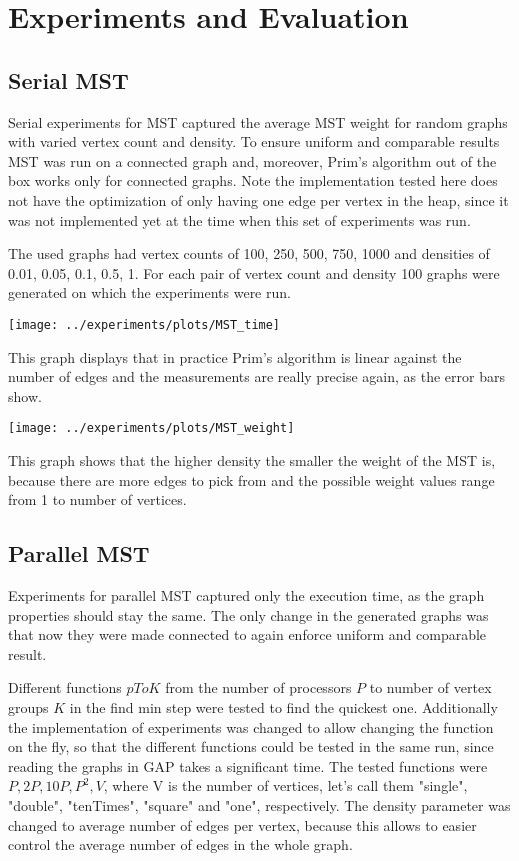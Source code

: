 \documentclass{report}
\theoremstyle{plain}
\theoremstyle{definition}
\theoremstyle{remark}
\begin{document}
\section{Experiments and Evaluation}

\subsection{Serial MST}

Serial experiments for MST captured the average MST weight for random graphs with varied vertex count and density. To ensure uniform and comparable results MST was run on a connected graph and, moreover, Prim's algorithm out of the box works only for connected graphs. Note the implementation tested here does not have the optimization of only having one edge per vertex in the heap, since it was not implemented yet at the time when this set of experiments was run.

The used graphs had vertex counts of 100, 250, 500, 750, 1000 and densities of 0.01, 0.05, 0.1, 0.5, 1. For each pair of vertex count and density 100 graphs were generated on which the experiments were run.

\texttt{[image: ../experiments/plots/MST\_time]}

This graph displays that in practice Prim's algorithm is linear against the number of edges and the measurements are really precise again, as the error bars show.

\texttt{[image: ../experiments/plots/MST\_weight]}

This graph shows that the higher density the smaller the weight of the MST is, because there are more edges to pick from and the possible weight values range from 1 to number of vertices.

\subsection{Parallel MST}

Experiments for parallel MST captured only the execution time, as the graph properties should stay the same. The only change in the generated graphs was that now they were made connected to again enforce uniform and comparable result.

Different functions $pToK$ from the number of processors $P$ to number of vertex groups $K$ in the find min step were tested to find the quickest one. Additionally the implementation of experiments was changed to allow changing the function on the fly, so that the different functions could be tested in the same run, since reading the graphs in GAP takes a significant time. The tested functions were $P, 2P, 10P, P^2, V$, where V is the number of vertices, let's call them "single", "double", "tenTimes", "square" and "one", respectively. The density parameter was changed to average number of edges per vertex, because this allows to easier control the average number of edges in the whole graph.
\end{document}
